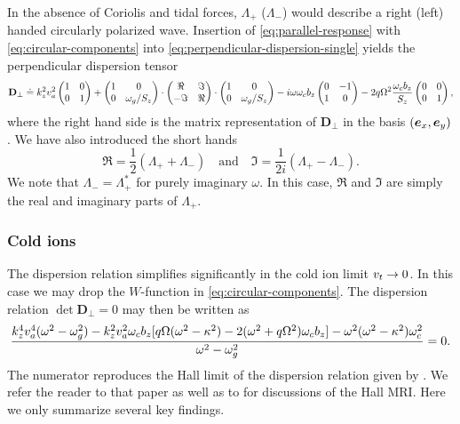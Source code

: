 \documentclass[aps,pre,notitlepage,amsmath,amssymb,amsfonts,nobibnotes,nofootinbib]{revtex4-1}
\begin{document}
In the absence of Coriolis and tidal forces, $\Lambda_{+}$ ($\Lambda_{-}$)
would describe a right (left) handed circularly polarized wave. Insertion of
\cref{eq:parallel-response} with \cref{eq:circular-components} into
\cref{eq:perpendicular-dispersion-single} yields the perpendicular dispersion
tensor
\begin{equation}
  \label{eq:D-perp}
  \mathbf{D}_\perp \doteq
  k_z^2\va^2\begin{pmatrix} 1 & 0 \\ 0 & 1\end{pmatrix}
  + \begin{pmatrix}
    1 & 0 \\ 0 & \omg/S_z
  \end{pmatrix}
  \cdot\begin{pmatrix}
    \Re & \Im \\ -\Im & \Re
  \end{pmatrix}
  \cdot\begin{pmatrix}
    1 & 0 \\ 0 & \omg/S_z
  \end{pmatrix}
  - i\omega\omc b_z\begin{pmatrix} 0 & -1 \\ 1 & 0\end{pmatrix}
  -2q\Omega^2\frac{\omc b_z}{S_z}\begin{pmatrix} 0 & 0 \\ 0 & 1\end{pmatrix},
\end{equation}
where the right hand side is the matrix representation of $\mathbf{D}_\perp$
in the basis $(\bm{e}_x,\bm{e}_y)$. We have also introduced the short hands
\begin{equation}
  \Re = \frac{1}{2}(\Lambda_{+} + \Lambda_{-})
  \quad\textrm{and}\quad
  \Im = \frac{1}{2i}(\Lambda_{+} - \Lambda_{-}).
\end{equation}
We note that $\Lambda_{-}=\Lambda_{+}^\ast$ for purely imaginary $\omega$. In
this case, $\Re$ and $\Im$ are simply the real and imaginary parts of
$\Lambda_{+}$.

\subsubsection{Cold ions}
\label{sec:cold-ions}

The dispersion relation simplifies significantly in the cold ion limit
$v_t\to0$. In this case we may drop the $W$-function in
\cref{eq:circular-components}. The dispersion relation
$\det\mathbf{D}_\perp=0$ may then be written as
\begin{equation}
  \label{eq:cold-mri-dispersion}
  \frac{k_z^4\va^4(\omega^2 - \omg^2)
  - k_z^2\va^2\omc b_z[q\Omega(\omega^2 - \kappa^2)
  - 2(\omega^2 + q\Omega^2)\omc b_z]
  - \omega^2(\omega^2 - \kappa^2)\omc^2}{\omega^2 - \omg^2} = 0.
\end{equation}
The numerator reproduces the Hall limit of the dispersion relation given by
\citet{Wardle1999}. We refer the reader to that paper as well as to
\citet{Balbus2001} for discussions of the Hall MRI\@. Here we only summarize
several key findings.
\end{document}
